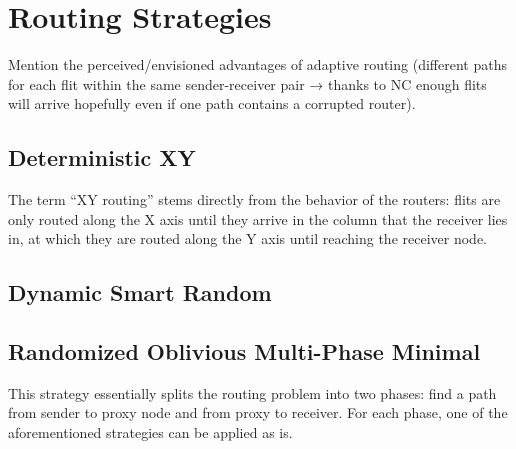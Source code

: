 \section{Routing Strategies}
Mention the perceived/envisioned advantages of adaptive routing (different paths for each flit within the same sender-receiver pair → thanks
to NC enough flits will arrive hopefully even if one path contains a corrupted router).

\subsection{Deterministic XY}
The term \enquote{XY routing} stems directly from the behavior of the routers: flits are only routed along the X axis until they arrive in the column
that the receiver lies in, at which they are routed along the Y axis until reaching the receiver node.
\subsection{Dynamic Smart Random}
\subsection{Randomized Oblivious Multi-Phase Minimal}
This strategy essentially splits the routing problem into two phases: find a path from sender to proxy node and from proxy to receiver. For each
phase, one of the aforementioned strategies can be applied as is.

